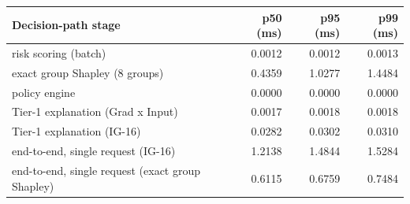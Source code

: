 \begin{tabular}{lrrr}
\toprule
Decision-path stage & p50 (ms) & p95 (ms) & p99 (ms) \\
\midrule
risk scoring (batch) & 0.0012 & 0.0012 & 0.0013 \\
exact group Shapley (8 groups) & 0.4359 & 1.0277 & 1.4484 \\
policy engine & 0.0000 & 0.0000 & 0.0000 \\
Tier-1 explanation (Grad x Input) & 0.0017 & 0.0018 & 0.0018 \\
Tier-1 explanation (IG-16) & 0.0282 & 0.0302 & 0.0310 \\
end-to-end, single request (IG-16) & 1.2138 & 1.4844 & 1.5284 \\
end-to-end, single request (exact group Shapley) & 0.6115 & 0.6759 & 0.7484 \\
\bottomrule
\end{tabular}
